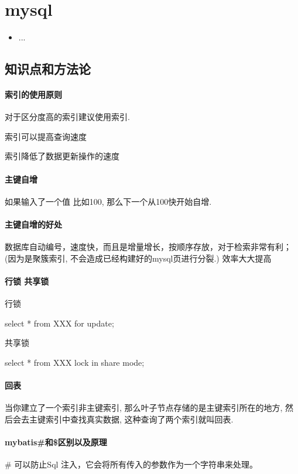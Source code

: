 \chapter{mysql}
\label{chap1}
\begin{itemize}[noitemsep,topsep=0pt,parsep=0pt,partopsep=0pt]
	\item ...
\end{itemize}

\section{知识点和方法论}
\subsubsection{索引的使用原则}
对于区分度高的索引建议使用索引.

索引可以提高查询速度

索引降低了数据更新操作的速度

\subsubsection{主键自增}

如果输入了一个值 比如100, 那么下一个从100快开始自增.

\subsubsection{主键自增的好处}
数据库自动编号，速度快，而且是增量增长，按顺序存放，对于检索非常有利；(因为是聚簇索引, 不会造成已经构建好的mysql页进行分裂.) 效率大大提高
\subsubsection{行锁 共享锁}
行锁

select * from XXX  for update;

共享锁

select * from XXX lock in share mode;

\subsubsection{回表}
当你建立了一个索引非主键索引, 那么叶子节点存储的是主键索引所在的地方, 然后会去主键索引中查找真实数据, 这种查询了两个索引就叫回表.
\subsubsection{mybatis\#和\$区别以及原理}
\#{ }可以防止Sql 注入，它会将所有传入的参数作为一个字符串来处理。

